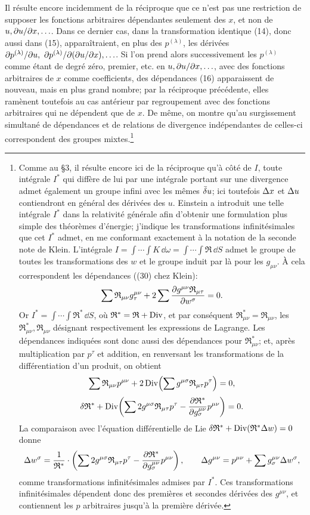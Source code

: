 Il résulte encore incidemment de la réciproque que ce n'est pas une restriction de supposer les fonctions arbitraires dépendantes seulement des \(x\), et non de \(u,\partial u/\partial x,\ldots\). Dans ce dernier cas, dans la transformation identique (14), donc aussi dans (15), apparaîtraient, en plus des \(p^{(\lambda)}\), les dérivées \(\partial p^{(\lambda)}/\partial u,\ \partial p^{(\lambda)}/\partial(\partial u/\partial x),\ldots\). Si l'on prend alors successivement les \(p^{(\lambda)}\) comme étant de degré zéro, premier, etc. en \(u,\partial u/\partial x,\ldots\), avec des fonctions arbitraires de \(x\) comme coefficients, des dépendances (16) apparaissent de nouveau, mais en plus grand nombre; par la réciproque précédente, elles ramènent toutefois au cas antérieur par regroupement avec des fonctions arbitraires qui ne dépendent que de \(x\). De même, on montre qu'au surgissement simultané de dépendances et de relations de divergence indépendantes de celles-ci correspondent des groupes mixtes.\footnote{Comme au \S{}3, il résulte encore ici de la réciproque qu'à côté de \(I\), toute intégrale \(I^*\) qui diffère de lui par une intégrale portant sur une divergence admet également un groupe infini avec les mêmes \(\bar{\delta} u\); ici toutefois \(\Delta x\) et \(\Delta u\) contiendront en général des dérivées des \(u\). Einstein a introduit une telle intégrale \(I^*\) dans la relativité générale afin d'obtenir une formulation plus simple des théorèmes d'énergie; j'indique les transformations infinitésimales que cet \(I^*\) admet, en me conformant exactement à la notation de la seconde note de Klein. L'intégrale \(I=\int\!\cdots\!\int K\,\dd\omega=\int\!\cdots\!\int \mathfrak{R}\,\dd S\) admet le groupe de toutes les transformations des \(w\) et le groupe induit par là pour les \(g_{\mu\nu}\). À cela correspondent les dépendances ((30) chez Klein):
\[
\sum \mathfrak{R}_{\mu\nu}g_\tau^{\mu\nu}
+2\sum\frac{\partial g^{\mu\nu}\mathfrak{R}_{\mu\tau}}{\partial w^\sigma}=0.
\]
Or \(I^*=\int\!\cdots\!\int \mathfrak{R}^*\,\dd S\), où \(\mathfrak{R}^*=\mathfrak{R}+\operatorname{Div}\), et par conséquent \(\mathfrak{R}_{\mu\nu}^*=\mathfrak{R}_{\mu\nu}\), les \(\mathfrak{R}_{\mu\nu}^*,\mathfrak{R}_{\mu\nu}\) désignant respectivement les expressions de Lagrange. Les dépendances indiquées sont donc aussi des dépendances pour \(\mathfrak{R}_{\mu\nu}^*\); et, après multiplication par \(p^\tau\) et addition, en renversant les transformations de la différentiation d'un produit, on obtient
\[
\sum \mathfrak{R}_{\mu\nu}p^{\mu\nu}
+2\operatorname{Div}\!\left(\sum g^{\mu\sigma}\mathfrak{R}_{\mu\tau}p^\tau\right)=0,
\]
\[
\delta\mathfrak{R}^*+\operatorname{Div}\!\left(\sum 2g^{\mu\sigma}\mathfrak{R}_{\mu\tau}p^\tau
-\frac{\partial\mathfrak{R}^*}{\partial g^{\mu\nu}_{\sigma}}p^{\mu\nu}\right)=0.
\]
La comparaison avec l'équation différentielle de Lie
\(\delta\mathfrak{R}^*+\operatorname{Div}(\mathfrak{R}^*\Delta w)=0\) donne
\[
\Delta w^\sigma=\frac1{\mathfrak{R}^*}\cdot\left(\sum 2g^{\mu\sigma}\mathfrak{R}_{\mu\tau}p^\tau
-\frac{\partial\mathfrak{R}^*}{\partial g^{\mu\nu}_{\sigma}}p^{\mu\nu}\right),
\qquad
\Delta g^{\mu\nu}=p^{\mu\nu}+\sum g^{\mu\nu}_{\sigma}\Delta w^\sigma,
\]
comme transformations infinitésimales admises par \(I^*\). Ces transformations infinitésimales dépendent donc des premières et secondes dérivées des \(g^{\mu\nu}\), et contiennent les \(p\) arbitraires jusqu'à la première dérivée.}

